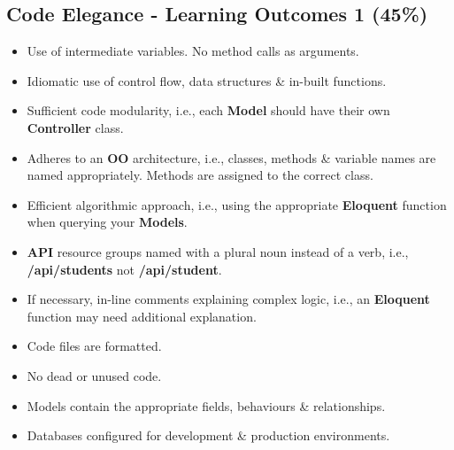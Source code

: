 \documentclass{article}
\begin{document}
\subsection*{Code Elegance - Learning Outcomes 1 (45\%)}
\begin{itemize}
	\item Use of intermediate variables. No method calls as arguments.
	\item Idiomatic use of control flow, data structures \& in-built functions.
	\item Sufficient code modularity, i.e., each \textbf{Model} should have their own \textbf{Controller} class.
	\item Adheres to an \textbf{OO} architecture, i.e., classes, methods \& variable names are named appropriately. Methods are assigned to the correct class.
	\item Efficient algorithmic approach, i.e., using the appropriate \textbf{Eloquent} function when querying your \textbf{Models}.
	\item \textbf{API} resource groups named with a plural noun instead of a verb, i.e., \textbf{/api/students} not \textbf{/api/student}.
	\item If necessary, in-line comments explaining complex logic, i.e., an \textbf{Eloquent} function may need additional explanation.
	\item Code files are formatted.
	\item No dead or unused code.
	\item Models contain the appropriate fields, behaviours \& relationships.
	\item Databases configured for development \& production environments.
\end{itemize}
\end{document}
